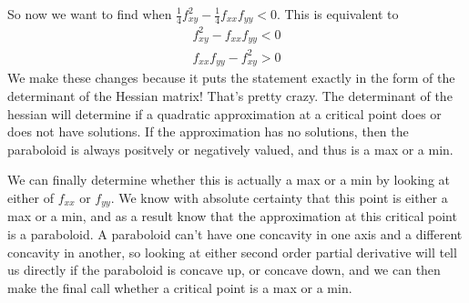 \documentclass[12pt, letterpaper]{article}
\begin{document}
So now we want to find when $\frac{1}{4}f_{xy}^2 - \frac{1}{4}f_{xx}f_{yy} < 0$. This is equivalent to
\begin{gather*}
    f_{xy}^2 - f_{xx}f_{yy} < 0 \\
    f_{xx}f_{yy} - f_{xy}^2 > 0
\end{gather*}
We make these changes because it puts the statement exactly in the form of the determinant of the Hessian matrix! That's pretty crazy. The determinant of the hessian will determine if a quadratic approximation at a critical point does or does not have solutions. If the approximation has no solutions, then the paraboloid is always positvely or negatively valued, and thus is a max or a min.

We can finally determine whether this is actually a max or a min by looking at either of $f_{xx}$ or $f_{yy}$. We know with absolute certainty that this point is either a max or a min,
and as a result know that the approximation at this critical point is a paraboloid. A paraboloid can't have one concavity in one axis and a different concavity in another,
so looking at either second order partial derivative will tell us directly if the paraboloid is concave up, or concave down, and we can then make the final call whether a critical point is a max or a min.
 
\end{document}
